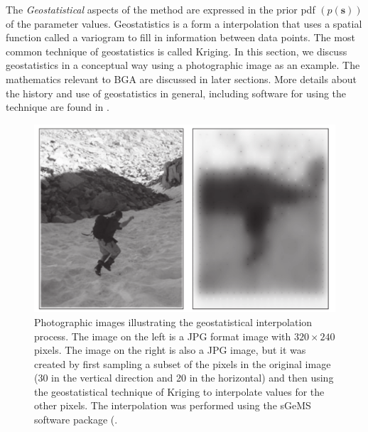 \documentclass[11pt,oneside,onecolumn]{usgsreport}
\begin{document}
\begin{multicols}{2}
\begin{bibunit}
The \emph{Geostatistical }aspects of the method are expressed in the
prior pdf $\left(p\left(\mathbf{s}\right)\right)$ of the parameter
values. Geostatistics is a form a interpolation that uses a spatial
function called a variogram to fill in information between data points.
The most common technique of geostatistics is called Kriging. In this
section, we discuss geostatistics in a conceptual way using a photographic
image as an example. The mathematics relevant to BGA are discussed
in later sections. More details about the history and use of geostatistics
in general, including software for using the technique are found in
\citet{Isaaks1989,DeutschJourneal1992,Kitanidis1997,sgems}.

\begin{figure}[!t]
\begin{center}\includegraphics[scale=0.6]{figures/Kriging_image}\end{center}

\caption{\label{fig:mikephoto}Photographic images illustrating the geostatistical
interpolation process. The image on the left is a JPG format image
with $320\times240$ pixels. The image on the right is also a JPG
image, but it was created by first sampling a subset of the pixels
in the original image (30 in the vertical direction and 20 in the
horizontal) and then using the geostatistical technique of Kriging
to interpolate values for the other pixels. The interpolation was
performed using the sGeMS software package (\citet{sgems}.}
\end{figure}



\end{bibunit}
\end{multicols}
\end{document}
